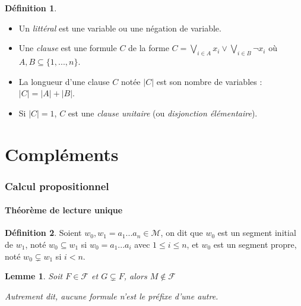 \documentclass[]{article}
\newtheorem{mylemma}{Lemme}
\theoremstyle{remark}
\theoremstyle{definition}
\newtheorem{mydef}{Définition}
\begin{document}
\begin{mydef}
	\leavevmode
	\begin{itemize}
		\item Un \textit{littéral} est une variable ou une négation de variable.
		
		\item Une \textit{clause} est une formule $C$ de la forme $\displaystyle C = \bigvee_{i \in A}x_i \lor \bigvee_{i \in B} \neg x_i$ où $A, B \subseteq \{1, ..., n\}$.
		
		\item La longueur d'une clause $C$ notée $|C|$ est son nombre de variables : $|C|=|A|+|B|$.
		
		\item Si $|C|=1$, $C$ est une \textit{clause unitaire} (ou \textit{disjonction élémentaire}).
	\end{itemize}
\end{mydef}

\part{Compléments}

\section{Calcul propositionnel}

\subsection{Théorème de lecture unique}

\begin{mydef}
	Soient $w_0, w_1=a_1...a_n \in \mathcal{M}$, on dit que $w_0$ est un segment initial de $w_1$, noté $w_0 \subseteq w_1$ si $w_0=a_1...a_i$ avec $1 \leqslant i \leqslant n$, et $w_0$ est un segment propre, noté $w_0 \subsetneq w_1$ si $i < n$.
\end{mydef}

\begin{mylemma}
	Soit $F \in \mathcal{F}$ et $G \subsetneq F$, alors $M \notin \mathcal{F}$
	
	Autrement dit, aucune formule n'est le préfixe d'une autre.
\end{mylemma}
\end{document}
